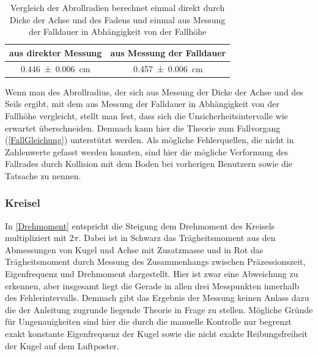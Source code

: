 \documentclass[
	a4paper,
	12pt,
	pagesize,
	ngerman
]{scrartcl}
\begin{document}
	\begin{table}[tb]
		\centering
		\begin{tabular}{ c | c }
			aus direkter Messung & aus Messung der Falldauer\\ \hline
			\SI{0,446 \pm 0,006}{cm} & \SI{0,457 \pm 0,006}{cm} \\
		\end{tabular}
		\caption{Vergleich der Abrollradien berechnet einmal direkt durch Dicke der Achse und des Fadens und einmal aus Messung der Falldauer in Abhängigkeit von der Fallhöhe}
		\label{Abrollradius_Vergleich} 
	\end{table}
	Wenn man des Abrollradius, der sich aus Messung der Dicke der Achse und des Seils ergibt, mit dem aus Messung der Falldauer in Abhängigkeit von der Fallhöhe vergleicht, stellt man fest, dass sich die Unsicherheitsintervalle wie erwartet überschneiden.
	Demnach kann hier die Theorie zum Fallvorgang (\cref{FallGleichung}) unterstützt werden.
	Als mögliche Fehlerquellen, die nicht in Zahlenwerte gefasst werden konnten, sind hier die mögliche Verformung des Fallrades durch Kollision mit dem Boden bei vorherigen Benutzern sowie die Tatsache zu nennen.
	
	\subsubsection{Kreisel}
	In \cref{Drehmoment} entspricht die Steigung dem Drehmoment des Kreisels multipliziert mit $2 \pi $.
	Dabei ist in Schwarz das Trägheitsmoment aus den Abmessungen von Kugel und Achse mit Zusatzmasse und in Rot das Trägheitsmoment durch Messung des Zusammenhangs zwischen Präzessionszeit, Eigenfrequenz und Drehmoment dargestellt.
	Hier ist zwar eine Abweichung zu erkennen, aber insgesamt liegt die Gerade in allen drei Messpunkten innerhalb des Fehlerintervalls.
	Demnach gibt das Ergebnis der Messung keinen Anlass dazu die der Anleitung zugrunde liegende Theorie in Frage zu stellen.
	Mögliche Gründe für Ungenauigkeiten sind hier die durch die manuelle Kontrolle nur begrenzt exakt konstante Eigenfrequenz der Kugel sowie die nicht exakte Reibungsfreiheit der Kugel auf dem Luftposter.
	
\end{document}
